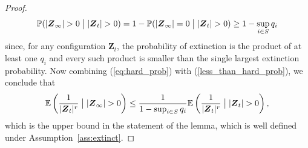 \documentclass[preprint,3p,12pt]{elsarticle}
\theoremstyle{definition}
\begin{document}
\begin{proof}
\begin{equation}
 \mathbb{P}(|\boldsymbol{Z}_{\infty}| >0\bigm| |\boldsymbol{Z}_{t}| >0 ) = 1 - \mathbb{P}(|\boldsymbol{Z}_{\infty}| = 0\bigm| |\boldsymbol{Z}_{t}| >0 ) \ge 1 - \sup_{i \in S}q_i \label{less_than_hard_prob} 
 \end{equation}
since, for any configuration $\boldsymbol{Z}_t$, the probability of extinction is the product of at least one $q_i$ and every such product is smaller than the single largest extinction probability. Now combining (\ref{eq:hard_prob}) with (\ref{less_than_hard_prob}), we conclude that
    \begin{equation*}
        \mathbb{E}\left(\frac{1}{|\boldsymbol{Z}_t|^r}\bigm| |\boldsymbol{Z}_{\infty}| >0 \right) \le \frac{1}{1 -\sup_{i \in S}q_i} \mathbb{E}\left(\frac{1}{|\boldsymbol{Z}_t|^r }\bigm| |\boldsymbol{Z}_t| >0\right),
    \end{equation*}
    which is the upper bound in the statement of the lemma, which is well defined under Assumption~\ref{ass:extinct}.

\end{proof}
\end{document}
